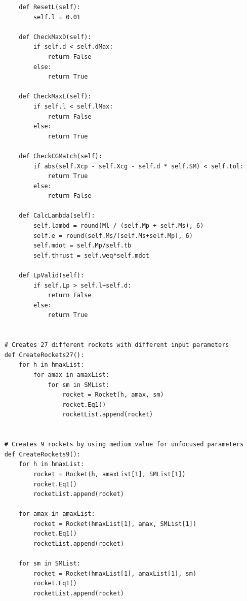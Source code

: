 \documentclass{report}
\begin{document}
\begin{lstlisting}
        def ResetL(self):
            self.l = 0.01

        def CheckMaxD(self):
            if self.d < self.dMax:
                return False
            else:
                return True

        def CheckMaxL(self):
            if self.l < self.lMax:
                return False
            else:
                return True

        def CheckCGMatch(self):
            if abs(self.Xcp - self.Xcg - self.d * self.SM) < self.tol:
                return True
            else:
                return False

        def CalcLambda(self):
            self.lambd = round(Ml / (self.Mp + self.Ms), 6)
            self.e = round(self.Ms/(self.Ms+self.Mp), 6)
            self.mdot = self.Mp/self.tb
            self.thrust = self.weq*self.mdot

        def LpValid(self):
            if self.Lp > self.l+self.d:
                return False
            else:
                return True


    # Creates 27 different rockets with different input parameters
    def CreateRockets27():
        for h in hmaxList:
            for amax in amaxList:
                for sm in SMList:
                    rocket = Rocket(h, amax, sm)
                    rocket.Eq1()
                    rocketList.append(rocket)


    # Creates 9 rockets by using medium value for unfocused parameters
    def CreateRockets9():
        for h in hmaxList:
            rocket = Rocket(h, amaxList[1], SMList[1])
            rocket.Eq1()
            rocketList.append(rocket)

        for amax in amaxList:
            rocket = Rocket(hmaxList[1], amax, SMList[1])
            rocket.Eq1()
            rocketList.append(rocket)

        for sm in SMList:
            rocket = Rocket(hmaxList[1], amaxList[1], sm)
            rocket.Eq1()
            rocketList.append(rocket)



\end{lstlisting}
\end{document}
